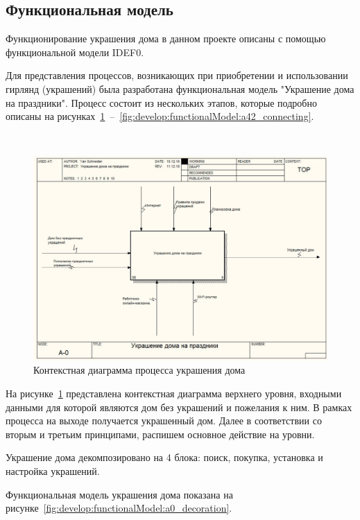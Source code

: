 \subsection{Функциональная модель}
\label{sec:develop:functionalModel}

Функционирование украшения дома в данном проекте описаны с помощью функциональной модели IDEF0.

Для представления процессов, возникающих при приобретении и использовании гирлянд (украшений) была разработана функциональная модель "Украшение дома на праздники". Процесс состоит из нескольких этапов, которые подробно описаны на рисунках~\ref{fig:develop:functionalModel:main}~–~\ref{fig:develop:functionalModel:a42_connecting}.

~
\begin{figure}[H]
\centering
	\includegraphics[scale=0.6]{figures/functionalModel/main.jpg}
	\caption{Контекстная диаграмма процесса украшения дома}
	\label{fig:develop:functionalModel:main}
\end{figure}

На рисунке~\ref{fig:develop:functionalModel:main} представлена контекстная диаграмма верхнего уровня, входными данными для которой являются дом без украшений и пожелания к ним. В рамках процесса на выходе получается украшенный дом. Далее в соответствии со вторым и третьим принципами, распишем основное действие на уровни.

Украшение дома декомпозировано на 4 блока: поиск, покупка, установка и настройка украшений.

Функциональная модель украшения дома показана на рисунке~\ref{fig:develop:functionalModel:a0_decoration}.

